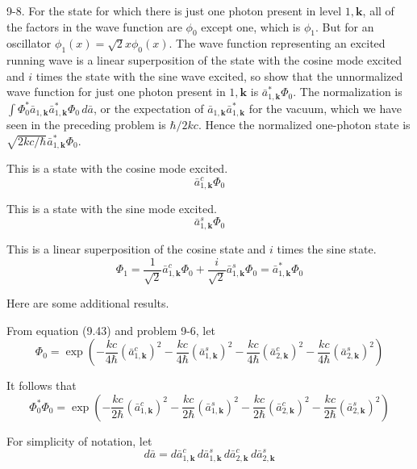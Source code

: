 \documentclass[12pt]{article}
\begin{document}
9-8.
For the state for which there is just one photon
present in level $1,\mathbf k$, all of the factors in the wave function are
$\phi_0$ except one, which is $\phi_1$.
But for an oscillator $\phi_1(x)=\sqrt2x\phi_0(x)$.
The wave function representing an excited running wave is a linear
superposition of the state with the cosine mode excited and $i$
times the state with the sine wave excited, so show that the
unnormalized wave function for just one photon present in
$1,\mathbf k$ is $\bar a_{1,\mathbf k}^*\Phi_0$.
The normalization is
$\int\Phi_0^*\bar a_{1,\mathbf k}\bar a_{1,\mathbf k}^*\Phi_0\,d\bar a$,
or the expectation of $\bar a_{1,\mathbf k}\bar a_{1,\mathbf k}^*$ for the
vacuum, which we have seen in the preceding problem is $\hbar/2kc$.
Hence the normalized one-photon state is
$\sqrt{2kc/\hbar}\bar a_{1,\mathbf k}^*\Phi_0$.

\bigskip
This is a state with the cosine mode excited.
\begin{equation*}
\bar a_{1,\mathbf k}^c\Phi_0
\end{equation*}

This is a state with the sine mode excited.
\begin{equation*}
\bar a_{1,\mathbf k}^s\Phi_0
\end{equation*}

This is a linear superposition of the cosine state and $i$ times the sine state.
\begin{equation*}
\Phi_1=\frac{1}{\sqrt2}\bar a_{1,\mathbf k}^c\Phi_0+\frac{i}{\sqrt2}\bar a_{1,\mathbf k}^s\Phi_0
=\bar a_{1,\mathbf k}^*\Phi_0
\end{equation*}

Here are some additional results.

\bigskip
From equation (9.43) and problem 9-6, let
\begin{equation*}
\Phi_0=\exp\left(
-\frac{kc}{4\hbar}(\bar a_{1,\mathbf k}^c)^2-\frac{kc}{4\hbar}(\bar a_{1,\mathbf k}^s)^2
-\frac{kc}{4\hbar}(\bar a_{2,\mathbf k}^c)^2-\frac{kc}{4\hbar}(\bar a_{2,\mathbf k}^s)^2
\right)
\end{equation*}

It follows that
\begin{equation*}
\Phi_0^*\Phi_0=\exp\left(
-\frac{kc}{2\hbar}(\bar a_{1,\mathbf k}^c)^2-\frac{kc}{2\hbar}(\bar a_{1,\mathbf k}^s)^2
-\frac{kc}{2\hbar}(\bar a_{2,\mathbf k}^c)^2-\frac{kc}{2\hbar}(\bar a_{2,\mathbf k}^s)^2
\right)
\end{equation*}

For simplicity of notation, let
\begin{equation*}
d\bar a=
d\bar a_{1,\mathbf k}^c\,d\bar a_{1,\mathbf k}^s
\,d\bar a_{2,\mathbf k}^c\,d\bar a_{2,\mathbf k}^s
\end{equation*}
\end{document}
